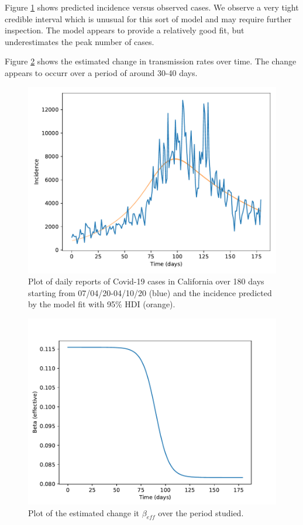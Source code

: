 \documentclass[11pt]{article}
\begin{document}
    Figure \ref{model_fit} shows predicted incidence versus observed cases. We observe a very tight credible interval which
    is unusual for this sort of model and may require further inspection.  The model appears to provide a relatively good fit,
    but underestimates the peak number of cases.

    Figure \ref{beta_over_time} shows the estimated change in transmission rates over time. The change appears to occurr
    over a period of around 30-40 days.

    \begin{figure}
        \centering
        \includegraphics[scale=0.75]{model_fit}
        \caption{Plot of daily reports of Covid-19 cases in California over 180 days starting from 07/04/20-04/10/20 (blue) 
        and the incidence predicted by the model fit with 95\% HDI (orange).}
        \label{model_fit}
    \end{figure}

    \begin{figure}
        \centering
        \includegraphics[scale=0.75]{beta_over_time}
        \caption{Plot of the estimated change it $\beta_{eff}$ over the period studied.}
        \label{beta_over_time}
    \end{figure}
\end{document}

